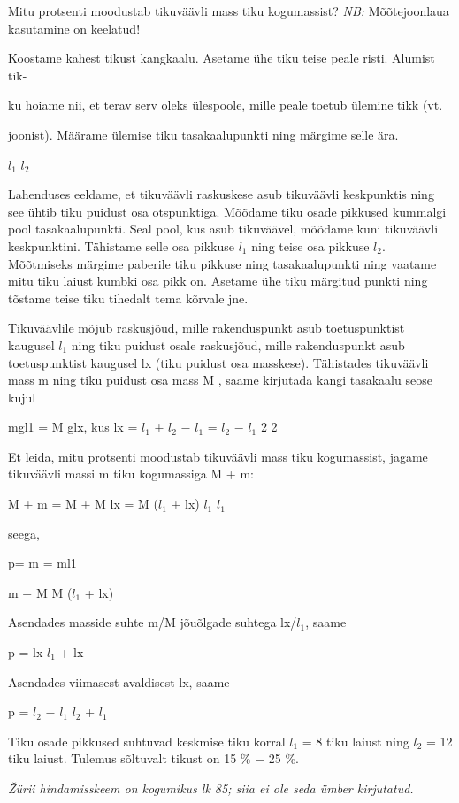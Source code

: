 
Mitu protsenti moodustab tikuväävli mass tiku kogumassist?
\textit{NB:} Mõõtejoonlaua kasutamine on keelatud!

\hint

\solu
Koostame kahest tikust kangkaalu. Asetame ühe tiku teise peale risti. Alumist tik-

ku hoiame nii, et terav serv oleks ülespoole, mille peale toetub ülemine tikk (vt.

joonist). Määrame ülemise tiku tasakaalupunkti ning märgime selle ära.

$l_1$ $l_2$

Lahenduses eeldame, et tikuväävli raskuskese asub tikuväävli keskpunktis ning see ühtib tiku puidust osa otspunktiga. Mõõdame tiku osade pikkused kummalgi pool tasakaalupunkti. Seal pool, kus asub tikuväävel, mõõdame kuni tikuväävli keskpunktini. Tähistame selle osa pikkuse $l_1$ ning teise osa pikkuse $l_2$. Mõõtmiseks märgime paberile tiku pikkuse ning tasakaalupunkti ning vaatame mitu tiku laiust kumbki osa pikk on. Asetame ühe tiku märgitud punkti ning tõstame teise tiku tihedalt tema kõrvale jne.

Tikuväävlile mõjub raskusjõud, mille rakenduspunkt asub toetuspunktist kaugusel $l_1$ ning tiku puidust osale raskusjõud, mille rakenduspunkt asub toetuspunktist kaugusel lx (tiku puidust osa masskese). Tähistades tikuväävli mass m ning tiku puidust osa mass M , saame kirjutada kangi tasakaalu seose kujul

mgl1 = M glx, kus lx = $l_1$ + $l_2$ $-$ $l_1$ = $l_2$ $-$ $l_1$ 2 2

Et leida, mitu protsenti moodustab tikuväävli mass tiku kogumassist, jagame tikuväävli massi m tiku kogumassiga M + m:

M + m = M + M lx = M ($l_1$ + lx) $l_1$ $l_1$

seega,

p= m = ml1

m + M M ($l_1$ + lx)

Asendades masside suhte m/M jõuõlgade suhtega lx/$l_1$, saame

p = lx $l_1$ + lx

Asendades viimasest avaldisest lx, saame

p = $l_2$ $-$ $l_1$ $l_2$ + $l_1$

Tiku osade pikkused suhtuvad keskmise tiku korral $l_1$ = 8 tiku laiust ning $l_2$ = 12 tiku laiust. Tulemus sõltuvalt tikust on 15 \% $-$ 25 \%.

\textit{Žürii hindamisskeem on kogumikus lk 85; siia ei ole seda ümber kirjutatud.}
\probend
